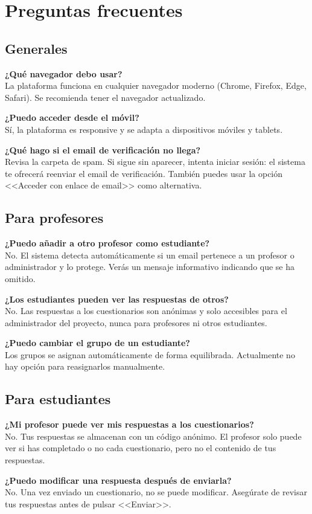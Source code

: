 \documentclass[11pt,a4paper]{article}
\newcommand{\seccion}[1]{\section{\textsf{\textcolor{azulUEx}{#1}}}}
\newcommand{\subseccion}[1]{\subsection{\textsf{\textcolor{verdeUEx}{#1}}}}
\begin{document}
\seccion{Preguntas frecuentes}

\subseccion{Generales}

\textbf{¿Qué navegador debo usar?}\\
La plataforma funciona en cualquier navegador moderno (Chrome, Firefox, Edge, Safari). Se recomienda tener el navegador actualizado.

\textbf{¿Puedo acceder desde el móvil?}\\
Sí, la plataforma es responsive y se adapta a dispositivos móviles y tablets.

\textbf{¿Qué hago si el email de verificación no llega?}\\
Revisa la carpeta de spam. Si sigue sin aparecer, intenta iniciar sesión: el sistema te ofrecerá reenviar el email de verificación. También puedes usar la opción <<Acceder con enlace de email>> como alternativa.

\subseccion{Para profesores}

\textbf{¿Puedo añadir a otro profesor como estudiante?}\\
No. El sistema detecta automáticamente si un email pertenece a un profesor o administrador y lo protege. Verás un mensaje informativo indicando que se ha omitido.

\textbf{¿Los estudiantes pueden ver las respuestas de otros?}\\
No. Las respuestas a los cuestionarios son anónimas y solo accesibles para el administrador del proyecto, nunca para profesores ni otros estudiantes.

\textbf{¿Puedo cambiar el grupo de un estudiante?}\\
Los grupos se asignan automáticamente de forma equilibrada. Actualmente no hay opción para reasignarlos manualmente.

\subseccion{Para estudiantes}

\textbf{¿Mi profesor puede ver mis respuestas a los cuestionarios?}\\
No. Tus respuestas se almacenan con un código anónimo. El profesor solo puede ver si has completado o no cada cuestionario, pero no el contenido de tus respuestas.

\textbf{¿Puedo modificar una respuesta después de enviarla?}\\
No. Una vez enviado un cuestionario, no se puede modificar. Asegúrate de revisar tus respuestas antes de pulsar <<Enviar>>.
\end{document}
